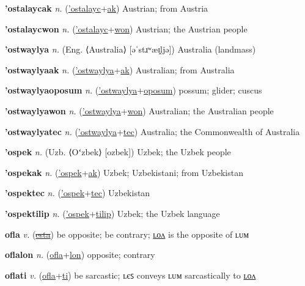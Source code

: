 \textbf{\hypertarget{'ostalaycak}{'ostalaycak}} \textit{n.} (\hyperlink{'ostalayc}{'ostalayc}+\allowbreak \hyperlink{ak}{ak})
Austrian; from Austria

\textbf{\hypertarget{'ostalaycwon}{'ostalaycwon}} \textit{n.} (\hyperlink{'ostalayc}{'ostalayc}+\allowbreak \hyperlink{won}{won})
Austrian; the Austrian people

\textbf{\hypertarget{'ostwaylya}{'ostwaylya}} \textit{n.} (Eng. ⟨Australia⟩ [əˈstɹʷæɪ̯ljə])
Australia (landmass)

\textbf{\hypertarget{'ostwaylyaak}{'ostwaylyaak}} \textit{n.} (\hyperlink{'ostwaylya}{'ostwaylya}+\allowbreak \hyperlink{ak}{ak})
Australian; from Australia

\textbf{\hypertarget{'ostwaylyaoposum}{'ostwaylyaoposum}} \textit{n.} (\hyperlink{'ostwaylya}{'ostwaylya}+\allowbreak \hyperlink{oposum}{oposum})
possum; glider; cuscus

\textbf{\hypertarget{'ostwaylyawon}{'ostwaylyawon}} \textit{n.} (\hyperlink{'ostwaylya}{'ostwaylya}+\allowbreak \hyperlink{won}{won})
Australian; the Australian people

\textbf{\hypertarget{'ostwaylyatec}{'ostwaylyatec}} \textit{n.} (\hyperlink{'ostwaylya}{'ostwaylya}+\allowbreak \hyperlink{tec}{tec})
Australia; the Commonwealth of Australia

\textbf{\hypertarget{'ospek}{'ospek}} \textit{n.} (Uzb. ⟨Oʻzbek⟩ [ozbek])
Uzbek; the Uzbek people

\textbf{\hypertarget{'ospekak}{'ospekak}} \textit{n.} (\hyperlink{'ospek}{'ospek}+\allowbreak \hyperlink{ak}{ak})
Uzbek; Uzbekistani; from Uzbekistan

\textbf{\hypertarget{'ospektec}{'ospektec}} \textit{n.} (\hyperlink{'ospek}{'ospek}+\allowbreak \hyperlink{tec}{tec})
Uzbekistan

\textbf{\hypertarget{'ospektilip}{'ospektilip}} \textit{n.} (\hyperlink{'ospek}{'ospek}+\allowbreak \hyperlink{tilip}{tilip})
Uzbek; the Uzbek language

\textbf{\hypertarget{ofla}{ofla}} \textit{v.} (\hyperlink{esta}{\sout{esta}})
be opposite; be contrary; \hyperlink{oflalon}{ʟᴏᴧ} is the opposite of ʟᴜᴍ

\textbf{\hypertarget{oflalon}{oflalon}} \textit{n.} (\hyperlink{ofla}{ofla}+\allowbreak \hyperlink{lon}{lon})
opposite; contrary

\textbf{\hypertarget{oflati}{oflati}} \textit{v.} (\hyperlink{ofla}{ofla}+\allowbreak \hyperlink{ti}{ti})
be sarcastic; ʟєꜱ conveys ʟᴜᴍ sarcastically to \hyperlink{oflatilon}{ʟᴏᴧ}

